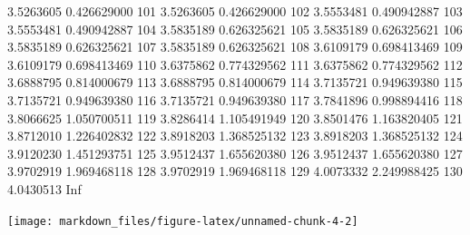 \documentclass[
]{article}
\begin{document}
3.5263605 0.426629000 101 3.5263605 0.426629000 102 3.5553481
0.490942887 103 3.5553481 0.490942887 104 3.5835189 0.626325621 105
3.5835189 0.626325621 106 3.5835189 0.626325621 107 3.5835189
0.626325621 108 3.6109179 0.698413469 109 3.6109179 0.698413469 110
3.6375862 0.774329562 111 3.6375862 0.774329562 112 3.6888795
0.814000679 113 3.6888795 0.814000679 114 3.7135721 0.949639380 115
3.7135721 0.949639380 116 3.7135721 0.949639380 117 3.7841896
0.998894416 118 3.8066625 1.050700511 119 3.8286414 1.105491949 120
3.8501476 1.163820405 121 3.8712010 1.226402832 122 3.8918203
1.368525132 123 3.8918203 1.368525132 124 3.9120230 1.451293751 125
3.9512437 1.655620380 126 3.9512437 1.655620380 127 3.9702919
1.969468118 128 3.9702919 1.969468118 129 4.0073332 2.249988425 130
4.0430513 Inf

\begin{center}\texttt{[image: markdown\_files/figure-latex/unnamed-chunk-4-2]} \end{center}
\end{document}
